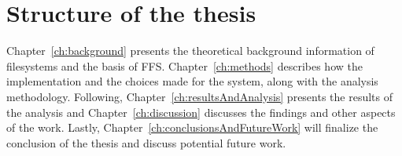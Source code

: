 \section{Structure of the thesis} %
Chapter~\ref{ch:background} presents the theoretical background information of filesystems and the basis of FFS.  Chapter~\ref{ch:methods} describes how the implementation and the choices made for the system, along with the analysis methodology. Following, Chapter~\ref{ch:resultsAndAnalysis} presents the results of the analysis and Chapter~\ref{ch:discussion} discusses the findings and other aspects of the work. Lastly, Chapter~\ref{ch:conclusionsAndFutureWork} will finalize the conclusion of the thesis and discuss potential future work.